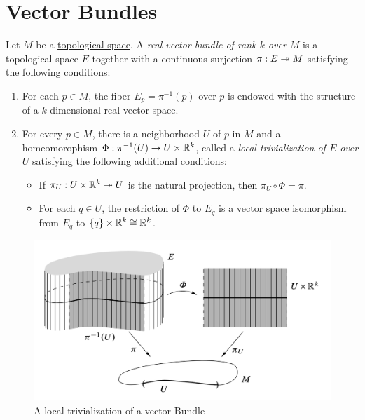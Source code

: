 \section{Vector Bundles}

\begin{definition}
    Let $M$ be a \underline{topological space}. A \emph{real vector bundle of rank $k$ over $M$} is a topological space $E$ together with a continuous surjection $\pi: E\twoheadrightarrow M$ satisfying the following conditions: 
    \begin{enumerate}[label=(\alph*)]
        \item For each $p\in M$, the fiber $E_p = \pi^{-1}(p)$ over $p$ is endowed with the structure of a $k$-dimensional real vector space.
        \item For every $p\in M$, there is a neighborhood $U$ of $p$ in $M$ and a homeomorophism $\Phi:\pi^{-1}(U)\to U\times\mathbb{R}^k$, called a \emph{local trivialization of $E$ over $U$} satisfying the following additional conditions: 
        \begin{itemize}
            \item If $\pi_U: U\times\mathbb{R}^k\twoheadrightarrow U$ is the natural projection, then $\pi_U\circ\Phi = \pi$.
            \item For each $q\in U$, the restriction of $\Phi$ to $E_q$ is a vector space isomorphism from $E_q$ to $\{q\}\times\mathbb{R}^k\cong\mathbb{R}^k$.
        \end{itemize}
    \end{enumerate}
\end{definition}

\begin{figure}[H]\label{fig:vector-bundle-illustration}
    \includegraphics[width=\textwidth, height=0.3\textheight]{images/vector-bundle-illustration.png}
    \caption{A local trivialization of a vector Bundle}
\end{figure}